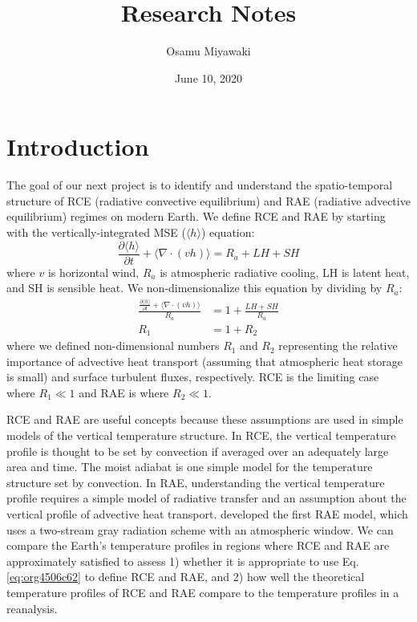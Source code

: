 \documentclass[11pt]{article}
\author{Osamu Miyawaki}
\date{June 10, 2020}
\title{Research Notes}
\begin{document}
\maketitle

\section{Introduction}
\label{sec:orge8aff1a}
The goal of our next project is to identify and understand the spatio-temporal structure of RCE (radiative convective equilibrium) and RAE (radiative advective equilibrium) regimes on modern Earth. We define RCE and RAE by starting with the vertically-integrated MSE (\(\langle h \rangle\)) equation:
\begin{equation}
\label{eq:org4506c62}
\frac{\partial \langle h \rangle}{\partial t} + \langle \nabla\cdot(vh) \rangle = R_a + LH + SH
\end{equation}
where \(v\) is horizontal wind, \(R_a\) is atmospheric radiative cooling, LH is latent heat, and SH is sensible heat. We non-dimensionalize this equation by dividing by \(R_a\):
\begin{align}
\frac{\frac{\partial \langle h \rangle}{\partial t} + \langle \nabla\cdot(vh) \rangle}{R_a}  &= 1 + \frac{LH + SH}{R_a} \\
R_1 &= 1 + R_2
\end{align}
where we defined non-dimensional numbers \(R_1\) and \(R_2\) representing the relative importance of advective heat transport (assuming that atmospheric heat storage is small) and surface turbulent fluxes, respectively. RCE is the limiting case where \(R_1 \ll 1\) and RAE is where \(R_2 \ll 1\).

RCE and RAE are useful concepts because these assumptions are used in simple models of the vertical temperature structure. In RCE, the vertical temperature profile is thought to be set by convection if averaged over an adequately large area and time. The moist adiabat is one simple model for the temperature structure set by convection. In RAE, understanding the vertical temperature profile requires a simple model of radiative transfer and an assumption about the vertical profile of advective heat transport. \cite{cronin_analytic_2016} developed the first RAE model, which uses a two-stream gray radiation scheme with an atmospheric window. We can compare the Earth's temperature profiles in regions where RCE and RAE are approximately satisfied to assess 1) whether it is appropriate to use Eq. \ref{eq:org4506c62} to define RCE and RAE, and 2) how well the theoretical temperature profiles of RCE and RAE compare to the temperature profiles in a reanalysis.
\end{document}
